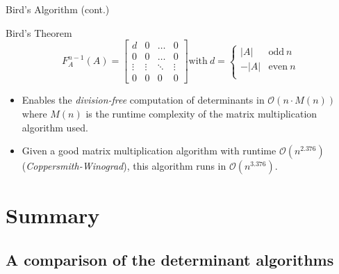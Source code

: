 \documentclass{beamer}
\begin{document}
\begin{frame}{Bird's Algorithm (cont.)}

    \begin{block}{Bird's Theorem}
        \[
            F_A^{n-1}(A) = 
            \begin{bmatrix}{}
                d      & 0      & \ldots & 0 \\
                0      & 0      & \ldots & 0 \\
                \vdots & \vdots & \ddots & \vdots \\
                0      & 0      & 0      & 0
            \end{bmatrix}
            \text{with} \ d = 
            \begin{cases}{}
                |A|  & \text{odd} \ n \\
                -|A| & \text{even} \ n \\
            \end{cases}
        \]
    \end{block}
    
    \begin{itemize}

        \item Enables the \emph{division-free} computation of determinants in $\mathcal{O}(n\cdot M(n))$
            where $M(n)$ is the runtime complexity of the matrix multiplication algorithm used.

        \item Given a good matrix multiplication algorithm with runtime $\mathcal{O}(n^{2.376})$ 
            (\emph{Coppersmith-Winograd}),
            this algorithm runs in $\mathcal{O}(n^{3.376})$.

    \end{itemize}

\end{frame}

\section{Summary}

\subsection{A comparison of the determinant algorithms}
\end{document}
